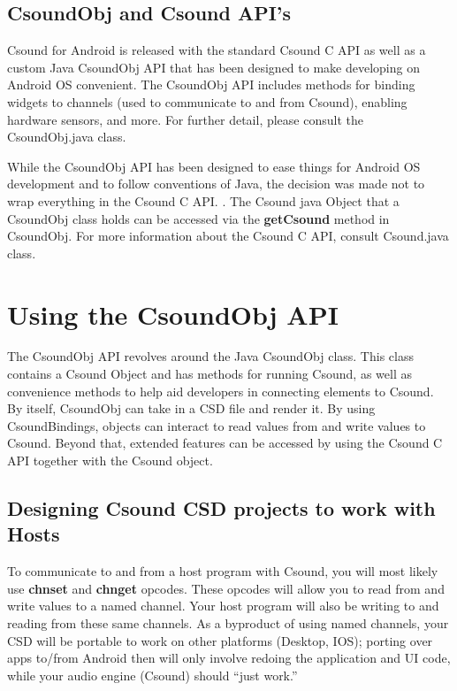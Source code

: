 \documentclass[11pt]{article}
\begin{document}
\subsection{CsoundObj and Csound API's}

Csound for Android is released with the standard Csound C API as well as a custom Java CsoundObj API that has been designed to make developing on Android OS convenient.  The CsoundObj API includes methods for binding widgets to channels (used to communicate to and from Csound), enabling hardware sensors, and more.  For further detail, please consult the CsoundObj.java class.

While the CsoundObj API has been designed to ease things for Android OS development and to follow conventions of Java, the decision was made not to wrap everything in the Csound C API. . The Csound java Object that a CsoundObj class holds can be accessed via the \textbf{getCsound} method in CsoundObj.  For more information about the Csound C API, consult Csound.java class.

\section{Using the CsoundObj API}

The CsoundObj API revolves around the Java CsoundObj class. This class contains a Csound Object and has methods for running Csound, as well as convenience methods to help aid developers in connecting elements to Csound. By itself, CsoundObj can take in a CSD file and render it.  By using CsoundBindings, objects can interact to read values from and write values to Csound.  Beyond that, extended features can be accessed by using the Csound C API together with the Csound object.

\subsection{Designing Csound CSD projects to work with Hosts}

To communicate to and from a host program with Csound, you will most likely use \textbf{chnset} and \textbf{chnget} opcodes. These opcodes will allow you to read from and write values to a named channel.  Your host program will also be writing to and reading from these same channels.  As a byproduct of using named channels, your CSD will be portable to work on other platforms (Desktop, IOS); porting over apps to/from Android then will only involve redoing the application and UI code, while your audio engine (Csound) should ``just work.'' 
\end{document}
